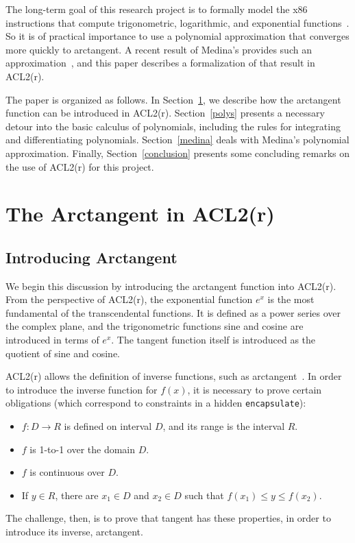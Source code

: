 \documentclass[copyright,creativecommons]{eptcs}
\begin{document}
The long-term goal of this research project is to formally model the
x86 instructions that compute trigonometric, logarithmic, and
exponential functions~\cite{Rus:transcendentals}.  So it is of
practical importance to use a polynomial approximation that converges
more quickly to arctangent. A recent result of Medina's provides such
an approximation~\cite{Med:arctan}, and this paper describes a
formalization of that result in ACL2(r).

The paper is organized as follows.  In Section~\ref{arctan}, we
describe how the arctangent function can be introduced in
ACL2(r). Section~\ref{polys} presents a necessary detour into the
basic calculus of polynomials, including the rules for integrating and
differentiating polynomials. Section~\ref{medina} deals with Medina's
polynomial approximation. Finally, Section~\ref{conclusion} presents
some concluding remarks on the use of ACL2(r) for this project.

\section{The Arctangent in ACL2(r)}
\label{arctan}

\subsection{Introducing Arctangent}

We begin this discussion by introducing the arctangent function into
ACL2(r). From the perspective of ACL2(r), the exponential function
$e^x$ is the most  fundamental of the transcendental functions. It is
defined as a power series over the complex plane, and the
trigonometric functions sine and cosine are introduced in terms
of $e^x$. The tangent function itself is introduced as
the quotient of sine and cosine.

ACL2(r) allows the definition of inverse functions, such as
arctangent~\cite{GaCo:inverses}.  In order to introduce the inverse
function for $f(x)$, it is necessary to prove certain obligations
(which correspond to constraints in a hidden \texttt{encapsulate}):
\begin{itemize}
\item $f:D\rightarrow R$ is defined on interval $D$, and its range is
  the interval $R$.
\item $f$ is 1-to-1 over the domain $D$.
\item $f$ is continuous over $D$.
\item If $y\in R$, there are $x_1\in D$ and $x_2\in D$ such
  that $f(x_1) \le y \le f(x_2)$.
\end{itemize}
The challenge, then, is to prove that tangent has these properties, in
order to introduce its inverse, arctangent.
\end{document}
